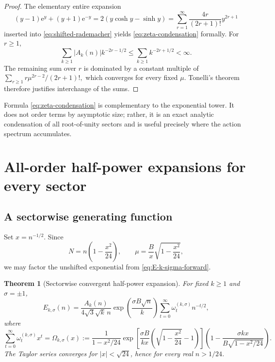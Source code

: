 \documentclass[11pt]{article}
\numberwithin{equation}{section}
\theoremstyle{mainthm}
\newtheorem{theorem}{Theorem}[section]
\theoremstyle{defstyle}
\theoremstyle{remark}
\newcommand{\e}{\mathrm e}
\begin{document}
\begin{proof}
The elementary entire expansion
\begin{equation}\label{eq:f-entire-expansion}
 (y-1)\e^y+(y+1)\e^{-y}
 =2(y\cosh y-\sinh y)
 =\sum_{r=1}^{\infty}\frac{4r}{(2r+1)!}y^{2r+1}
\end{equation}
inserted into \eqref{eq:shifted-rademacher} yields \eqref{eq:zeta-condensation} formally.  For \(r\ge1\),
\[
 \sum_{k\ge1}|A_k(n)|k^{-2r-1/2}
 \le\sum_{k\ge1}k^{-2r+1/2}<\infty.
\]
The remaining sum over \(r\) is dominated by a constant multiple of
\(
 \sum_{r\ge1}r\mu^{2r-2}/(2r+1)!,
\)
which converges for every fixed \(\mu\).  Tonelli's theorem therefore justifies interchange of the sums.
\end{proof}

Formula \eqref{eq:zeta-condensation} is complementary to the exponential tower.  It does not order terms by asymptotic size; rather, it is an exact analytic condensation of all root-of-unity sectors and is useful precisely where the action spectrum accumulates.

\section{All-order half-power expansions for every sector}\label{sec:forward-coefficients}

\subsection{A sectorwise generating function}

Set \(x=n^{-1/2}\).  Since
\[
 N=n\left(1-\frac{x^2}{24}\right),
 \qquad
 \mu=\frac{B}{x}\sqrt{1-\frac{x^2}{24}},
\]
we may factor the unshifted exponential from \eqref{eq:E-k-sigma-forward}.

\begin{theorem}[Sectorwise convergent half-power expansion]\label{thm:sector-generating-function}
For fixed \(k\ge1\) and \(\sigma=\pm1\),
\begin{equation}\label{eq:sector-half-power}
 E_{k,\sigma}(n)=
 \frac{A_k(n)}{4\sqrt3\sqrt{k}\,n}
 \exp\!\left(\frac{\sigma B\sqrt n}{k}\right)
 \sum_{t=0}^{\infty}\omega_t^{(k,\sigma)}n^{-t/2},
\end{equation}
where
\begin{equation}\label{eq:omega-generating}
 \sum_{t=0}^{\infty}\omega_t^{(k,\sigma)}x^t
 =\Omega_{k,\sigma}(x)
 :=\frac{1}{1-x^2/24}
 \exp\!\left[
 \frac{\sigma B}{kx}
 \left(\sqrt{1-\frac{x^2}{24}}-1\right)
 \right]
 \left(
 1-\frac{\sigma kx}{B\sqrt{1-x^2/24}}
 \right).
\end{equation}
The Taylor series converges for \(|x|<\sqrt{24}\), hence for every real \(n>1/24\).
\end{theorem}
\end{document}
